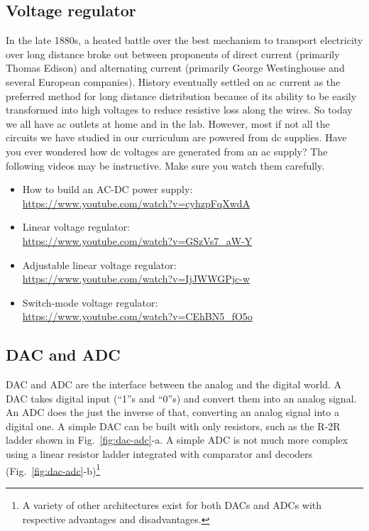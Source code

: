 \documentclass[letterpaper, 11pt]{article}
\begin{document}
\subsection{Voltage regulator}
In the late 1880s, a heated battle over the best mechanism to transport electricity over long distance broke out between proponents of direct current (primarily Thomas Edison) and alternating current (primarily George Westinghouse and several European companies). History eventually settled on ac current as the preferred method for long distance distribution because of its ability to be easily transformed into high voltages to reduce resistive loss along the wires. So today we all have ac outlets at home and in the lab. However, most if not all the circuits we have studied in our curriculum are powered from dc supplies. Have you ever wondered how dc voltages are generated from an ac supply? The following videos may be instructive. Make sure you watch them carefully. 

\begin{itemize}[itemsep=0.1ex]
	\item How to build an AC-DC power supply:\\ \url{https://www.youtube.com/watch?v=cyhzpFqXwdA} 
	\item Linear voltage regulator:\\ \url{https://www.youtube.com/watch?v=GSzVs7_aW-Y}
	\item Adjustable linear voltage regulator:\\  \url{https://www.youtube.com/watch?v=IjJWWGPjc-w}
	\item Switch-mode voltage regulator:\\ \url{https://www.youtube.com/watch?v=CEhBN5_fO5o}
\end{itemize}

\subsection{DAC and ADC}

DAC and ADC are the interface between the analog and the digital world. A DAC takes digital input (``1''s and ``0''s) and convert them into an analog signal. An ADC does the just the inverse of that, converting an analog signal into a digital one. A simple DAC can be built with only resistors, such as the R-2R ladder shown in Fig.~\ref{fig:dac-adc}-a. A simple ADC is not much more complex using a linear resistor ladder integrated with comparator and decoders (Fig.~\ref{fig:dac-adc}-b)\footnote{A variety of other architectures exist for both DACs and ADCs with respective advantages and disadvantages.}
\end{document}
